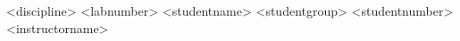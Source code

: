 



\thetitlepage
  {<discipline>}
  {<labnumber>}
  {<studentname>}
  {<studentgroup>}
  {<studentnumber>}
  {<instructorname>}

